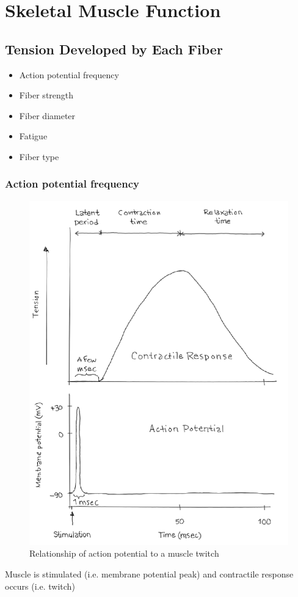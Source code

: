 \documentclass[11pt,fleqn]{book}
\begin{document}
\section{Skeletal Muscle Function}
\subsection{Tension Developed by Each Fiber}
\begin{itemize}
    \item Action potential frequency
    \item Fiber strength
    \item Fiber diameter
    \item Fatigue
    \item Fiber type
\end{itemize}

\subsubsection{Action potential frequency}
\begin{figure}[h!]
\begin{center}
    \includegraphics[width=0.5\linewidth]{Pictures/Screenshot 2024-04-03 225713.png}
    \caption{Relationship of action potential to a muscle twitch}
\end{center}
\end{figure}

\begin{remark}
    Muscle is stimulated (i.e. membrane
potential peak) and contractile
response occurs (i.e. twitch)
\end{remark}
\end{document}
